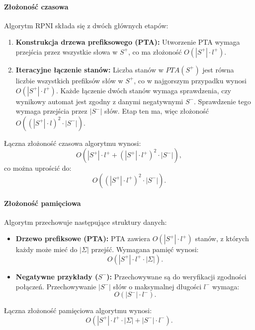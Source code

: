 \paragraph*{Złożoność czasowa}
Algorytm RPNI składa się z dwóch głównych etapów:
\begin{enumerate}
    \item \textbf{Konstrukcja drzewa prefiksowego (PTA):}
    Utworzenie PTA wymaga przejścia przez wszystkie słowa w \( S^+ \), co ma złożoność \( O(|S^+| \cdot l^+) \).
    \item \textbf{Iteracyjne łączenie stanów:}
    Liczba stanów w \( PTA(S^+) \) jest równa liczbie wszystkich prefiksów słów w \( S^+ \), co w najgorszym przypadku wynosi \( O(|S^+| \cdot l^+) \). Każde łączenie dwóch stanów wymaga sprawdzenia, czy wynikowy automat jest zgodny z danymi negatywnymi \( S^- \). Sprawdzenie tego wymaga przejścia przez \( |S^-| \) słów. Etap ten ma, więc złożoność \( O((|S^+| \cdot l)^2 \cdot |S^-|) \).
\end{enumerate}

Łączna złożoność czasowa algorytmu wynosi:
\[
O(|S^+| \cdot l^+ + (|S^+| \cdot l^+)^2 \cdot |S^-|),
\]
co można uprościć do:
\[
O((|S^+| \cdot l^+)^2 \cdot |S^-|).
\]


\paragraph*{Złożoność pamięciowa}
Algorytm przechowuje następujące struktury danych:
\begin{itemize}
    \item \textbf{Drzewo prefiksowe (PTA):}  
    PTA zawiera \( O(|S^+| \cdot l^+) \) stanów, z których każdy może mieć do \( |\Sigma| \) przejść. Wymagana pamięć wynosi:
    \[
    O(|S^+| \cdot l^+ \cdot |\Sigma|).
    \]

    \item \textbf{Negatywne przykłady (\( S^- \)):}  
    Przechowywane są do weryfikacji zgodności połączeń. Przechowywanie \( |S^-| \) słów o maksymalnej długości \( l^- \) wymaga:
    \[
    O(|S^-| \cdot l^-).
    \]
\end{itemize}

Łączna złożoność pamięciowa algorytmu wynosi:
\[
O(|S^+| \cdot l^+ \cdot |\Sigma| + |S^-| \cdot l^-).
\]

